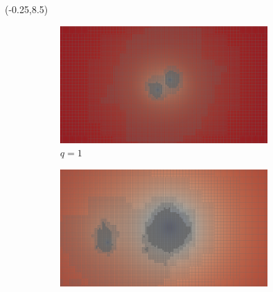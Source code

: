 \documentclass[landscape]{a0poster}
\begin{document}
\begin{textblock}{30}
\begin{textblock}{29}(-0.25,8.5)
	\begin{figure}
		\begin{subfigure}{0.33\textwidth}
			\includegraphics[width=\textwidth]{../sc18/figs/img_slice_level_r1.png}
			\caption{\large $q=1$}
		\end{subfigure}
		\begin{subfigure}{0.33\textwidth}
			\includegraphics[width=\textwidth]{../sc18/figs/img_slice_level_r10.png}

\end{subfigure}
\end{figure}
\end{textblock}
\end{textblock}
\end{document}
